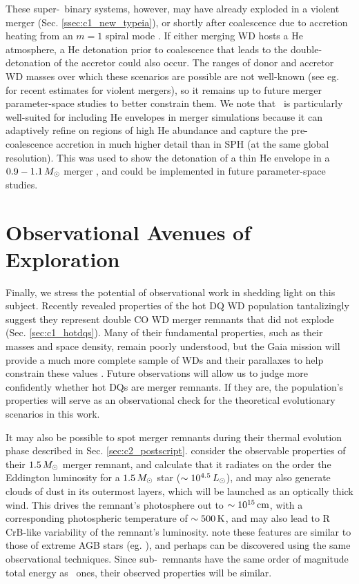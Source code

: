 These super-\Mch\ binary systems, however, may have already exploded in a violent merger (Sec. \ref{ssec:c1_new_typeia}), or shortly after coalescence due to accretion heating from an $m = 1$ spiral mode \citep{kash+15}.  If either merging WD hosts a He atmosphere, a He detonation prior to coalescence \citep{guil+10, rask+12, pakm+13} that leads to the double-detonation of the accretor could also occur.  The ranges of donor and accretor WD masses over which these scenarios are possible are not well-known (see eg. \citealt{dan+12, sato+16} for recent estimates for violent mergers), so it remains up to future merger parameter-space studies to better constrain them.  We note that \arepo\ is particularly well-suited for including He envelopes in merger simulations because it can adaptively refine on regions of high He abundance and capture the pre-coalescence accretion in much higher detail than in SPH (at the same global resolution).  This was used to show the detonation of a thin He envelope in a $0.9-1.1\,\Msun$ merger \citep{pakm+13}, and could be implemented in future parameter-space studies.
 
\section{Observational Avenues of Exploration}

Finally, we stress the potential of observational work in shedding light on this subject.  Recently revealed properties of the hot DQ WD population tantalizingly suggest they represent double CO WD merger remnants that did not explode (Sec. \ref{sec:c1_hotdqs}).  Many of their fundamental properties, such as their masses and space density, remain poorly understood, but the Gaia mission will provide a much more complete sample of WDs and their parallaxes to help constrain these values \citep{dunl15thesis}.  Future observations will allow us to judge more confidently whether hot DQs are merger remnants.  If they are, the population's properties will serve as an observational check for the theoretical evolutionary scenarios in this work.

It may also be possible to spot merger remnants during their thermal evolution phase described in Sec. \ref{sec:c2_postscript}.  \cite{schw+16} consider the observable properties of their $1.5\,\Msun$ merger remnant, and calculate that it radiates on the order the Eddington luminosity for a $1.5\,\Msun$ star ($\sim10^{4.5}\,\Lsun$), and may also generate clouds of dust in its outermost layers, which will be launched as an optically thick wind.  This drives the remnant's photosphere out to $\sim10^{15}\,\mathrm{cm}$, with a corresponding photospheric temperature of $\sim500\,\mathrm{K}$, and may also lead to R CrB-like variability of the remnant's luminosity.  \cite{schw+16} note these features are similar to those of extreme AGB stars (eg. \citealt{blum+06}), and perhaps can be discovered using the same observational techniques.  Since sub-\Mch\ remnants have the same order of magnitude total energy as \Mch\ ones, their observed properties will be similar.

